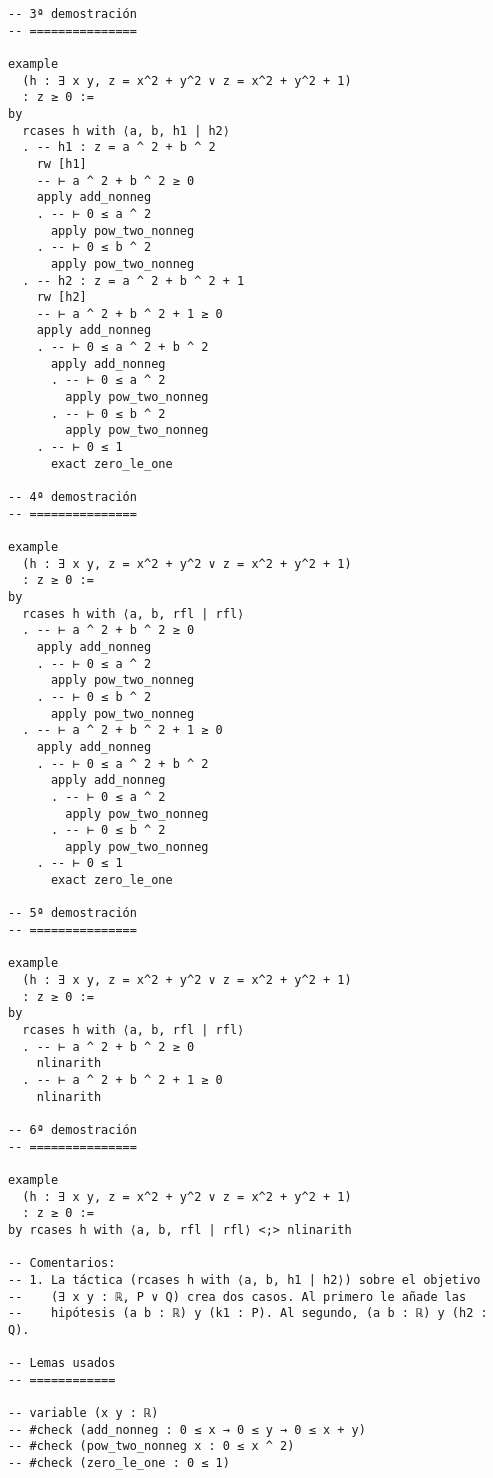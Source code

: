 \begin{verbatim}
-- 3ª demostración
-- ===============

example
  (h : ∃ x y, z = x^2 + y^2 ∨ z = x^2 + y^2 + 1)
  : z ≥ 0 :=
by
  rcases h with ⟨a, b, h1 | h2⟩
  . -- h1 : z = a ^ 2 + b ^ 2
    rw [h1]
    -- ⊢ a ^ 2 + b ^ 2 ≥ 0
    apply add_nonneg
    . -- ⊢ 0 ≤ a ^ 2
      apply pow_two_nonneg
    . -- ⊢ 0 ≤ b ^ 2
      apply pow_two_nonneg
  . -- h2 : z = a ^ 2 + b ^ 2 + 1
    rw [h2]
    -- ⊢ a ^ 2 + b ^ 2 + 1 ≥ 0
    apply add_nonneg
    . -- ⊢ 0 ≤ a ^ 2 + b ^ 2
      apply add_nonneg
      . -- ⊢ 0 ≤ a ^ 2
        apply pow_two_nonneg
      . -- ⊢ 0 ≤ b ^ 2
        apply pow_two_nonneg
    . -- ⊢ 0 ≤ 1
      exact zero_le_one

-- 4ª demostración
-- ===============

example
  (h : ∃ x y, z = x^2 + y^2 ∨ z = x^2 + y^2 + 1)
  : z ≥ 0 :=
by
  rcases h with ⟨a, b, rfl | rfl⟩
  . -- ⊢ a ^ 2 + b ^ 2 ≥ 0
    apply add_nonneg
    . -- ⊢ 0 ≤ a ^ 2
      apply pow_two_nonneg
    . -- ⊢ 0 ≤ b ^ 2
      apply pow_two_nonneg
  . -- ⊢ a ^ 2 + b ^ 2 + 1 ≥ 0
    apply add_nonneg
    . -- ⊢ 0 ≤ a ^ 2 + b ^ 2
      apply add_nonneg
      . -- ⊢ 0 ≤ a ^ 2
        apply pow_two_nonneg
      . -- ⊢ 0 ≤ b ^ 2
        apply pow_two_nonneg
    . -- ⊢ 0 ≤ 1
      exact zero_le_one

-- 5ª demostración
-- ===============

example
  (h : ∃ x y, z = x^2 + y^2 ∨ z = x^2 + y^2 + 1)
  : z ≥ 0 :=
by
  rcases h with ⟨a, b, rfl | rfl⟩
  . -- ⊢ a ^ 2 + b ^ 2 ≥ 0
    nlinarith
  . -- ⊢ a ^ 2 + b ^ 2 + 1 ≥ 0
    nlinarith

-- 6ª demostración
-- ===============

example
  (h : ∃ x y, z = x^2 + y^2 ∨ z = x^2 + y^2 + 1)
  : z ≥ 0 :=
by rcases h with ⟨a, b, rfl | rfl⟩ <;> nlinarith

-- Comentarios:
-- 1. La táctica (rcases h with ⟨a, b, h1 | h2⟩) sobre el objetivo
--    (∃ x y : ℝ, P ‌∨ Q) crea dos casos. Al primero le añade las
--    hipótesis (a b : ℝ) y (k1 : P). Al segundo, (a b : ℝ) y (h2 : Q).

-- Lemas usados
-- ============

-- variable (x y : ℝ)
-- #check (add_nonneg : 0 ≤ x → 0 ≤ y → 0 ≤ x + y)
-- #check (pow_two_nonneg x : 0 ≤ x ^ 2)
-- #check (zero_le_one : 0 ≤ 1)
\end{verbatim}

